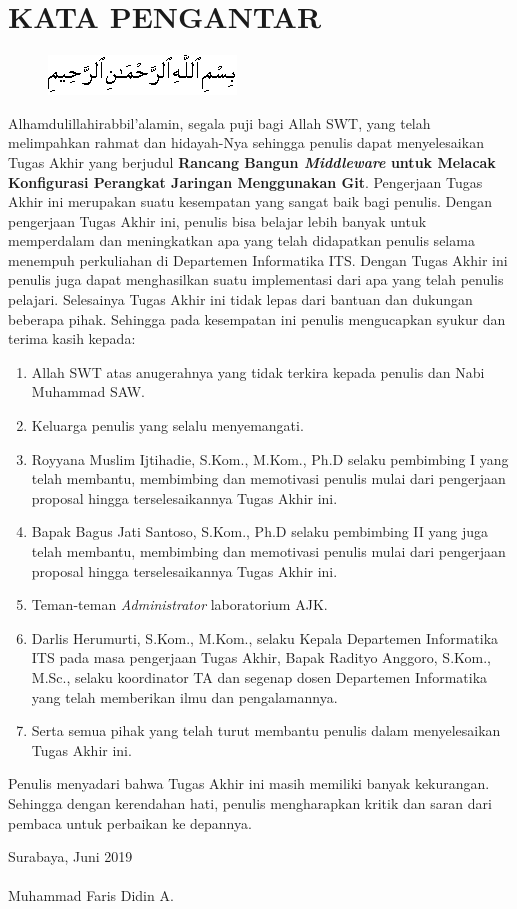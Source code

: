\chapter{KATA PENGANTAR}
		\begin{figure}[h]
			\centering
			\includegraphics[width=0.5\linewidth]{img/bismillah.png}
		\end{figure}

		Alhamdulillahirabbil’alamin, segala puji bagi Allah SWT, yang telah melimpahkan rahmat dan hidayah-Nya sehingga penulis dapat menyelesaikan Tugas Akhir yang berjudul \textbf{Rancang Bangun \textit{Middleware} untuk Melacak Konfigurasi Perangkat Jaringan Menggunakan Git}. Pengerjaan Tugas Akhir ini merupakan suatu kesempatan yang sangat baik bagi penulis. Dengan pengerjaan Tugas Akhir ini, penulis bisa belajar lebih banyak untuk memperdalam dan meningkatkan apa yang telah didapatkan penulis selama menempuh perkuliahan di Departemen Informatika ITS. Dengan Tugas Akhir ini penulis juga dapat menghasilkan suatu implementasi dari apa yang telah penulis pelajari.
		Selesainya Tugas Akhir ini tidak lepas dari bantuan dan dukungan beberapa pihak. Sehingga pada kesempatan ini penulis mengucapkan syukur dan terima kasih kepada:
		\begin{enumerate}
			\item Allah SWT atas anugerahnya yang tidak terkira kepada penulis dan Nabi Muhammad SAW.
            \item Keluarga penulis yang selalu menyemangati.
			\item Royyana Muslim Ijtihadie, S.Kom., M.Kom.,   Ph.D selaku pembimbing I yang telah membantu, membimbing dan memotivasi penulis mulai dari pengerjaan proposal hingga terselesaikannya Tugas Akhir ini.
			\item Bapak Bagus Jati Santoso, S.Kom., Ph.D selaku pembimbing II yang juga telah membantu, membimbing dan memotivasi penulis mulai dari pengerjaan proposal hingga terselesaikannya Tugas Akhir ini.
            \item Teman-teman \textit{Administrator} laboratorium AJK.
			\item Darlis Herumurti, S.Kom., M.Kom., selaku Kepala Departemen Informatika ITS pada masa pengerjaan Tugas Akhir, Bapak Radityo Anggoro, S.Kom., M.Sc., selaku koordinator TA dan segenap dosen Departemen Informatika yang telah memberikan ilmu dan pengalamannya.
			\item Serta semua pihak yang telah turut membantu penulis dalam menyelesaikan Tugas Akhir ini.
		\end{enumerate}

		Penulis menyadari bahwa Tugas Akhir ini masih memiliki banyak kekurangan. Sehingga dengan kerendahan hati, penulis mengharapkan kritik dan saran dari pembaca untuk perbaikan ke depannya.

	\hfill Surabaya, Juni 2019 \\ \\ 


  \hfill Muhammad Faris Didin A.
